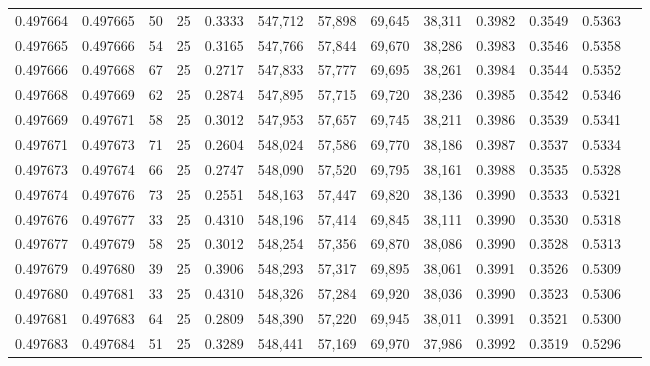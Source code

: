 \begin{tabular}{rrrrrrrrrrrrr}
0.497664 & 0.497665 &    50 &  25 &                                     0.3333 & 547,712 &  57,898 &  69,645 &  38,311 & 0.3982 & 0.3549 & 0.5363 \\
0.497665 & 0.497666 &    54 &  25 &                                     0.3165 & 547,766 &  57,844 &  69,670 &  38,286 & 0.3983 & 0.3546 & 0.5358 \\
0.497666 & 0.497668 &    67 &  25 &                                     0.2717 & 547,833 &  57,777 &  69,695 &  38,261 & 0.3984 & 0.3544 & 0.5352 \\
0.497668 & 0.497669 &    62 &  25 &                                     0.2874 & 547,895 &  57,715 &  69,720 &  38,236 & 0.3985 & 0.3542 & 0.5346 \\
0.497669 & 0.497671 &    58 &  25 &                                     0.3012 & 547,953 &  57,657 &  69,745 &  38,211 & 0.3986 & 0.3539 & 0.5341 \\
0.497671 & 0.497673 &    71 &  25 &                                     0.2604 & 548,024 &  57,586 &  69,770 &  38,186 & 0.3987 & 0.3537 & 0.5334 \\
0.497673 & 0.497674 &    66 &  25 &                                     0.2747 & 548,090 &  57,520 &  69,795 &  38,161 & 0.3988 & 0.3535 & 0.5328 \\
0.497674 & 0.497676 &    73 &  25 &                                     0.2551 & 548,163 &  57,447 &  69,820 &  38,136 & 0.3990 & 0.3533 & 0.5321 \\
0.497676 & 0.497677 &    33 &  25 &                                     0.4310 & 548,196 &  57,414 &  69,845 &  38,111 & 0.3990 & 0.3530 & 0.5318 \\
0.497677 & 0.497679 &    58 &  25 &                                     0.3012 & 548,254 &  57,356 &  69,870 &  38,086 & 0.3990 & 0.3528 & 0.5313 \\
0.497679 & 0.497680 &    39 &  25 &                                     0.3906 & 548,293 &  57,317 &  69,895 &  38,061 & 0.3991 & 0.3526 & 0.5309 \\
0.497680 & 0.497681 &    33 &  25 &                                     0.4310 & 548,326 &  57,284 &  69,920 &  38,036 & 0.3990 & 0.3523 & 0.5306 \\
0.497681 & 0.497683 &    64 &  25 &                                     0.2809 & 548,390 &  57,220 &  69,945 &  38,011 & 0.3991 & 0.3521 & 0.5300 \\
0.497683 & 0.497684 &    51 &  25 &                                     0.3289 & 548,441 &  57,169 &  69,970 &  37,986 & 0.3992 & 0.3519 & 0.5296 \\

\end{tabular}
